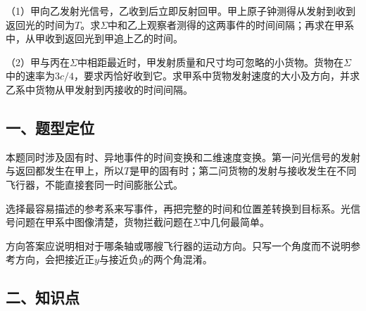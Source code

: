 \documentclass[12pt,a4paper,fontset=fandol]{ctexart}
\begin{document}
\begin{center}
\begin{minipage}{\linewidth}
\centering\begingroup{}
\ifdim\wd\diagrambox>.88\linewidth
\sbox{\diagrambox}{\resizebox{.88\linewidth}{!}{\usebox{\diagrambox}}}\fi
\ifdim\ht\diagrambox>.38\textheight
\resizebox{!}{.38\textheight}{\usebox{\diagrambox}}
\else\usebox{\diagrambox}\fi
\par{}\endgroup\end{minipage}\end{center}

（1）甲向乙发射光信号，乙收到后立即反射回甲。甲上原子钟测得从发射到收到返回光的时间为\(T\)。求\(\Sigma\)中和乙上观察者测得的这两事件的时间间隔；再求在甲系中，从甲收到返回光到甲追上乙的时间。

（2）甲与丙在\(\Sigma\)中相距最近时，甲发射质量和尺寸均可忽略的小货物。货物在\(\Sigma\)中的速率为\(3c/4\)，要求丙恰好收到它。求甲系中货物发射速度的大小及方向，并求乙系中货物从甲发射到丙接收的时间间隔。

\subsection{一、题型定位}\label{ux4e00ux9898ux578bux5b9aux4f4d-4}

本题同时涉及固有时、异地事件的时间变换和二维速度变换。第一问光信号的发射与返回都发生在甲上，所以\(T\)是甲的固有时；第二问货物的发射与接收发生在不同飞行器，不能直接套同一时间膨胀公式。

选择最容易描述的参考系来写事件，再把完整的时间和位置差转换到目标系。光信号问题在甲系中图像清楚，货物拦截问题在\(\Sigma\)中几何最简单。

方向答案应说明相对于哪条轴或哪艘飞行器的运动方向。只写一个角度而不说明参考方向，会把接近正\(y\)与接近负\(y\)的两个角混淆。

\subsection{二、知识点}\label{ux4e8cux77e5ux8bc6ux70b9-4}
\end{document}
